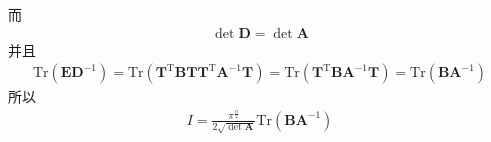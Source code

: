 \documentclass[12pt]{article}
\begin{document}
    而
    \begin{equation}\begin{aligned}
        \det{\bm{D}} = \det{\bm{A}}
    \end{aligned}\end{equation}
    并且
    \begin{equation}\begin{aligned}
        \mathrm{Tr}(\bm{ED}^{-1}) = \mathrm{Tr}(\bm{T}^\mathrm{T}\bm{BT}\bm{T}^\mathrm{T} \bm{A}^{-1}\bm{T})
        = \mathrm{Tr}(\bm{T}^\mathrm{T}\bm{BA}^{-1}\bm{T})
        = \mathrm{Tr}(\bm{BA}^{-1})
    \end{aligned}\end{equation}
    所以
    \begin{equation}\begin{aligned}
        I = \frac {\pi^{\frac n2}}{2\sqrt{\det{\bm{A}}}} \mathrm{Tr} (\bm{BA}^{-1})
    \end{aligned}\end{equation}
\end{document}
